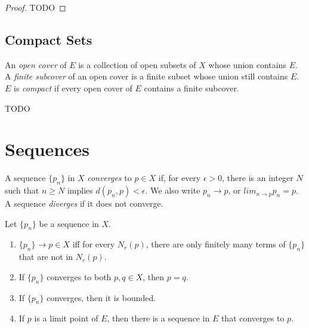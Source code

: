     \begin{proof}
        TODO
    \end{proof}
    
    \subsection{Compact Sets}
    
    \begin{defn} \label{def_analysis_compact}
        An \emph{open cover} of $E$ is a collection of open subsets of $X$ whose union contains $E$. A \emph{finite subcover} of an open cover is a finite subset whose union still contains $E$. $E$ is \emph{compact} if every open cover of $E$ contains a finite subcover.
    \end{defn}
    
    TODO
    
    \section{Sequences}
    
    \begin{defn}[Convergence] \label{def_analysis_converge}
        A sequence $\{p_n\}$ in $X$ \emph{converges} to $p \in X$ if, for every $\epsilon > 0$, there is an integer $N$ such that $n \geq N$ implies $d(p_n, p) < \epsilon$. We also write $p_n \rightarrow p$, or $lim_{n \rightarrow p} p_n = p$. A sequence \emph{diverges} if it does not converge.
    \end{defn}
    
    \begin{prop} \label{prop_analysis_converge}
        Let $\{p_n\}$ be a sequence in $X$. \begin{enumerate}
        \item $\{p_n\} \rightarrow p \in X$ iff for every $N_r(p)$, there are only finitely many terms of $\{p_n\}$ that are not in $N_r(p)$.
        \item If $\{p_n\}$ converges to both $p,q \in X$, then $p = q$.
        \item If $\{p_n\}$ converges, then it is bounded.
        \item If $p$ is a limit point of $E$, then there is a sequence in $E$ that converges to $p$.
    \end{enumerate} \end{prop}
    
